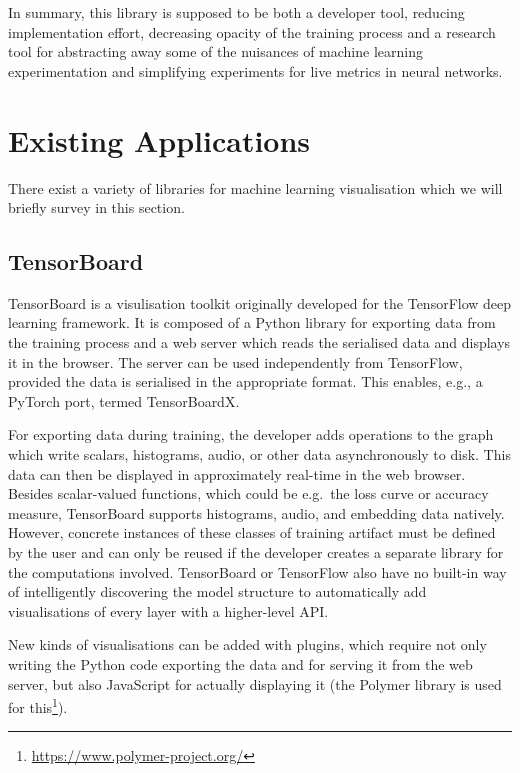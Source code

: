 In summary, this library is supposed to be both a developer tool, reducing
implementation effort, decreasing opacity of the training process and a research tool for
abstracting away some of the nuisances of machine learning experimentation and
simplifying experiments for live metrics in neural networks.

\hypertarget{sec:existing-apps}{%
\section{Existing Applications}\label{sec:existing-apps}}

There exist a variety of libraries for machine learning visualisation which we
will briefly survey in this section.

\hypertarget{tensorboard}{%
\subsection*{TensorBoard}\label{tensorboard}}

TensorBoard is a visulisation toolkit originally developed for the TensorFlow
\citep{tensorflow2015-whitepaper} deep learning framework. It is composed of a
Python library for exporting data from the training process and a web server
which reads the serialised data and displays it in the browser. The server can
be used independently from TensorFlow, provided the data is serialised in the
appropriate format. This enables, e.g., a PyTorch port, termed TensorBoardX.

For exporting data during training, the developer adds operations to the
graph which write scalars, histograms, audio, or other data
asynchronously to disk. This data can then be displayed in approximately
real-time in the web browser. Besides scalar-valued functions, which
could be e.g.~the loss curve or accuracy measure, TensorBoard supports
histograms, audio, and embedding data natively. However, concrete
instances of these classes of training artifact must be defined by the
user and can only be reused if the developer creates a separate library
for the computations involved. TensorBoard or TensorFlow also have no built-in
way of intelligently discovering the model structure to automatically add
visualisations of every layer with a higher-level API.

New kinds of visualisations can be added with plugins, which require not
only writing the Python code exporting the data and for serving it from
the web server, but also JavaScript for actually displaying it (the
Polymer library is used for this\footnote{\url{https://www.polymer-project.org/}}).

